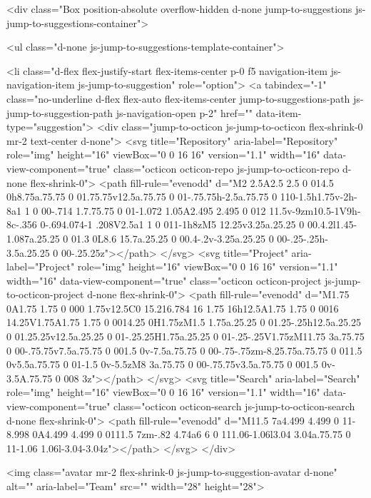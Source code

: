           <div class="Box position-absolute overflow-hidden d-none jump-to-suggestions js-jump-to-suggestions-container">
            
<ul class="d-none js-jump-to-suggestions-template-container">
  

<li class="d-flex flex-justify-start flex-items-center p-0 f5 navigation-item js-navigation-item js-jump-to-suggestion" role="option">
  <a tabindex="-1" class="no-underline d-flex flex-auto flex-items-center jump-to-suggestions-path js-jump-to-suggestion-path js-navigation-open p-2" href="" data-item-type="suggestion">
    <div class="jump-to-octicon js-jump-to-octicon flex-shrink-0 mr-2 text-center d-none">
      <svg title="Repository" aria-label="Repository" role="img" height="16" viewBox="0 0 16 16" version="1.1" width="16" data-view-component="true" class="octicon octicon-repo js-jump-to-octicon-repo d-none flex-shrink-0">
    <path fill-rule="evenodd" d="M2 2.5A2.5 2.5 0 014.5 0h8.75a.75.75 0 01.75.75v12.5a.75.75 0 01-.75.75h-2.5a.75.75 0 110-1.5h1.75v-2h-8a1 1 0 00-.714 1.7.75.75 0 01-1.072 1.05A2.495 2.495 0 012 11.5v-9zm10.5-1V9h-8c-.356 0-.694.074-1 .208V2.5a1 1 0 011-1h8zM5 12.25v3.25a.25.25 0 00.4.2l1.45-1.087a.25.25 0 01.3 0L8.6 15.7a.25.25 0 00.4-.2v-3.25a.25.25 0 00-.25-.25h-3.5a.25.25 0 00-.25.25z"></path>
</svg>
      <svg title="Project" aria-label="Project" role="img" height="16" viewBox="0 0 16 16" version="1.1" width="16" data-view-component="true" class="octicon octicon-project js-jump-to-octicon-project d-none flex-shrink-0">
    <path fill-rule="evenodd" d="M1.75 0A1.75 1.75 0 000 1.75v12.5C0 15.216.784 16 1.75 16h12.5A1.75 1.75 0 0016 14.25V1.75A1.75 1.75 0 0014.25 0H1.75zM1.5 1.75a.25.25 0 01.25-.25h12.5a.25.25 0 01.25.25v12.5a.25.25 0 01-.25.25H1.75a.25.25 0 01-.25-.25V1.75zM11.75 3a.75.75 0 00-.75.75v7.5a.75.75 0 001.5 0v-7.5a.75.75 0 00-.75-.75zm-8.25.75a.75.75 0 011.5 0v5.5a.75.75 0 01-1.5 0v-5.5zM8 3a.75.75 0 00-.75.75v3.5a.75.75 0 001.5 0v-3.5A.75.75 0 008 3z"></path>
</svg>
      <svg title="Search" aria-label="Search" role="img" height="16" viewBox="0 0 16 16" version="1.1" width="16" data-view-component="true" class="octicon octicon-search js-jump-to-octicon-search d-none flex-shrink-0">
    <path fill-rule="evenodd" d="M11.5 7a4.499 4.499 0 11-8.998 0A4.499 4.499 0 0111.5 7zm-.82 4.74a6 6 0 111.06-1.06l3.04 3.04a.75.75 0 11-1.06 1.06l-3.04-3.04z"></path>
</svg>
    </div>

    <img class="avatar mr-2 flex-shrink-0 js-jump-to-suggestion-avatar d-none" alt="" aria-label="Team" src="" width="28" height="28">

